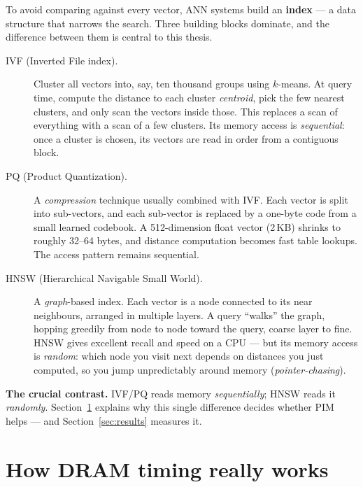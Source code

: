 \documentclass[11pt,a4paper]{article}
\newcommand{\term}[1]{\textbf{\color{slate}#1}}
\begin{document}
To avoid comparing against every vector, ANN systems build an \term{index} --- a data structure that
narrows the search. Three building blocks dominate, and the difference between them is central to
this thesis.

\begin{description}
\item[\color{teal}IVF (Inverted File index).] Cluster all vectors into, say, ten thousand groups
using $k$-means. At query time, compute the distance to each cluster \emph{centroid}, pick the few
nearest clusters, and only scan the vectors inside those. This replaces a scan of everything with a
scan of a few clusters. Its memory access is \emph{sequential}: once a cluster is chosen, its
vectors are read in order from a contiguous block.

\item[\color{teal}PQ (Product Quantization).] A \emph{compression} technique usually combined with
IVF. Each vector is split into sub-vectors, and each sub-vector is replaced by a one-byte code from
a small learned codebook. A 512-dimension float vector (2\,KB) shrinks to roughly 32--64 bytes, and
distance computation becomes fast table lookups. The access pattern remains sequential.

\item[\color{teal}HNSW (Hierarchical Navigable Small World).] A \emph{graph}-based index. Each vector
is a node connected to its near neighbours, arranged in multiple layers. A query ``walks'' the graph,
hopping greedily from node to node toward the query, coarse layer to fine. HNSW gives excellent
recall and speed on a CPU --- but its memory access is \emph{random}: which node you visit next
depends on distances you just computed, so you jump unpredictably around memory
(\emph{pointer-chasing}).
\end{description}

\begin{keybox}
\textbf{The crucial contrast.} IVF/PQ reads memory \emph{sequentially}; HNSW reads it
\emph{randomly}. Section~\ref{sec:dram} explains why this single difference decides whether PIM
helps --- and Section~\ref{sec:results} measures it.
\end{keybox}

\section{How DRAM timing really works}
\label{sec:dram}
\end{document}
